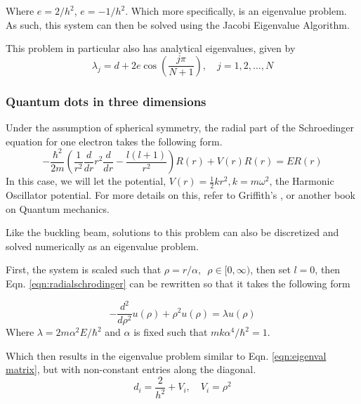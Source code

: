 \documentclass[10pt,showpacs,preprintnumbers,footinbib,amsmath,amssymb,aps,prl,twocolumn,groupedaddress,superscriptaddress,showkeys]{revtex4-1}
\begin{document}
    Where $e=2/h^2$, $e=-1/h^2$.
    Which more specifically, is an eigenvalue problem. As such, this system can then be solved
    using the Jacobi Eigenvalue Algorithm. \cite{question_text}

    This problem in particular also has analytical eigenvalues, given by
    \begin{equation}
      \label{eqn:analytic eigenvals}
      \lambda_j = d + 2e\cos\left( \frac{j\pi}{N+1} \right), \quad j=1, 2, \dots, N
    \end{equation}


  \subsubsection{Quantum dots in three dimensions}
    Under the assumption of spherical symmetry, the radial part of the Schroedinger equation for one electron takes 
    the following form.
    \begin{equation}
      \label{eqn:radialschrodinger}
      -\frac{\hbar^2}{2m}\left( \frac{1}{r^2}\frac{d}{dr}r^2\frac{d}{dr} - \frac{l(l+1)}{r^2} \right)
      R(r) + V(r)R(r) = ER(r)
    \end{equation}
    In this case, we will let the potential, $V(r)=\frac{1}{2}kr^2, k=m\omega^2$, the Harmonic Oscillator potential.
    For more details on this, refer to Griffith's \cite{griffiths}, or another book on Quantum mechanics.

    Like the buckling beam, solutions to this problem can also be discretized and solved numerically as an eigenvalue
    problem.

    First, the system is scaled such that $\rho = r/\alpha,\enspace \rho \in [0, \infty)$, then set $l=0$, then Eqn. \ref{eqn:radialschrodinger} can be rewritten so that it takes the following form \cite{question_text}

    \begin{equation}
      \label{eqn:1electron_para}
      -\frac{d^2}{d\rho^2} u(\rho) + \rho^2 u(\rho) = \lambda u(\rho)
    \end{equation}
    Where $\lambda = 2m\alpha^2E /\hbar^2$ and $\alpha$ is fixed such that $mk\alpha^4/\hbar^2=1$.

    Which then results in the eigenvalue problem similar to Eqn. \ref{eqn:eigenval matrix}, but with non-constant entries along the diagonal. 
    \begin{equation}
      d_i = \frac{2}{h^2} + V_i, \quad V_i = \rho^2
    \end{equation}
\end{document}
